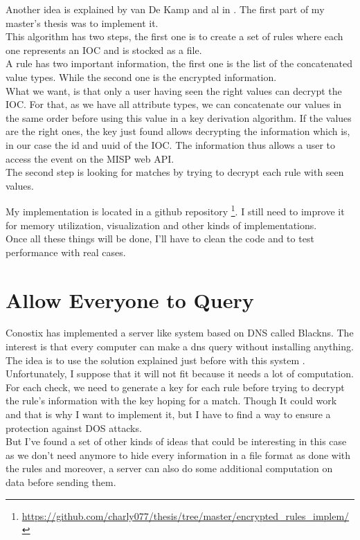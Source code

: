 \documentclass[10pt]{article}
\begin{document}
Another idea is explained by van De Kamp and al in \cite{van2016private}. The first part of my master's thesis was to implement it.\\
This algorithm has two steps, the first one is to create a set of rules where each one represents an IOC and is stocked as a file.\\
A rule has two important information, the first one is the list of the concatenated value types. While the second one is the encrypted information.\\
What we want, is that only a user having seen the right values can decrypt the IOC. For that, as we have all attribute types, we can concatenate our values in the same order before using this value in a key derivation algorithm. If the values are the right ones, the key just found allows decrypting the information which is, in our case the id and uuid of the IOC. The information thus allows a user to access the event on the MISP web API.\\
The second step is looking for matches by trying to decrypt each rule with seen values.

My implementation is located in a github repository \footnote{\url{https://github.com/charly077/thesis/tree/master/encrypted_rules_implem/}}. I still need to improve it for memory utilization, visualization and other kinds of implementations.\\
Once all these things will be done, I'll have to clean the code and to test performance with real cases.

\section{Allow Everyone to Query}
Conostix has implemented a server like system based on DNS called Blackns. The interest is that every computer can make a dns query without installing anything. The idea is to use the solution explained just before with this system . Unfortunately, I suppose that it will not fit because it needs a lot of computation. For each check, we need to generate a key for each rule before trying to decrypt the rule's information with the key hoping for a match. Though It could work and that is why I want to implement it, but I have to find a way to ensure a protection against DOS attacks.\\
But I've found a set of other kinds of ideas that could be interesting in this case as we don't need anymore to hide every information in a file format as done with the rules and moreover, a server can also do some additional computation on data before sending them.
\end{document}
